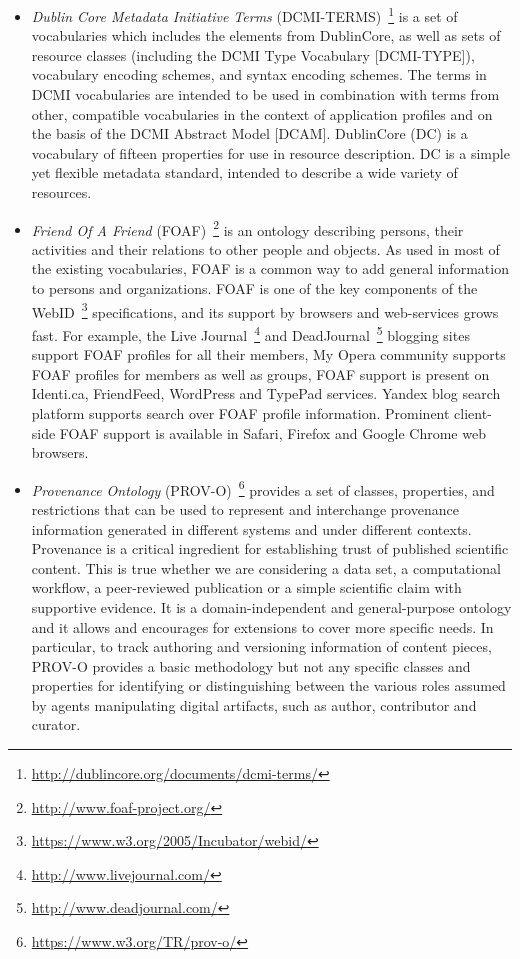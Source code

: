 \documentclass[PhD, Submit, ngerman,UKenglish,table]{scrbook}
\begin{document}
\begin{itemize}
\item \emph{Dublin Core Metadata Initiative Terms} (DCMI-TERMS)~\footnote{\url{http://dublincore.org/documents/dcmi-terms/}} is a set of vocabularies which includes the elements from DublinCore, as well as sets of resource classes (including the DCMI Type Vocabulary [DCMI-TYPE]), vocabulary encoding schemes, and syntax encoding schemes.
The terms in DCMI vocabularies are intended to be used in combination with terms from other, compatible vocabularies in the context of application profiles and on the basis of the DCMI Abstract Model [DCAM].
DublinCore (DC) is a vocabulary of fifteen properties for use in resource description.
DC is a simple yet flexible metadata standard, intended to describe a wide variety of resources.

\item{\emph{Friend Of A Friend} (FOAF)~\footnote{\url{http://www.foaf-project.org/}}} is an ontology describing persons, their activities and their relations to other people and objects.
As used in most of the existing vocabularies, FOAF is a common way to add general information to persons and organizations.
FOAF is one of the key components of the WebID~\footnote{\url{https://www.w3.org/2005/Incubator/webid/}} specifications, and its support by browsers and web-services grows fast.
For example, the Live Journal~\footnote{\url{http://www.livejournal.com/}} and DeadJournal~\footnote{\url{http://www.deadjournal.com/}} blogging sites support FOAF profiles for all their members, My Opera community supports FOAF profiles for members as well as groups, FOAF support is present on Identi.ca, FriendFeed, WordPress and TypePad services. Yandex blog search platform supports search over FOAF profile information.
Prominent client-side FOAF support is available in Safari, Firefox and Google Chrome web browsers. 

\item{\emph{Provenance Ontology} (PROV-O)~\footnote{\url{https://www.w3.org/TR/prov-o/}}} provides a set of classes, properties, and restrictions that can be used to represent and interchange provenance information generated in different systems and under different contexts. 
Provenance is a critical ingredient for establishing trust of published scientific content.
This is true whether we are considering a data set, a computational workflow, a peer-reviewed publication or a simple scientific claim with supportive evidence.
It is a domain-independent and general-purpose ontology and it allows and encourages for extensions to cover more specific needs. 
In particular, to track authoring and versioning information of content pieces, PROV-O provides a basic methodology but not any specific classes and properties for identifying or distinguishing between the various roles assumed by agents manipulating digital artifacts, such as author, contributor and curator.

\end{itemize}
\end{document}
